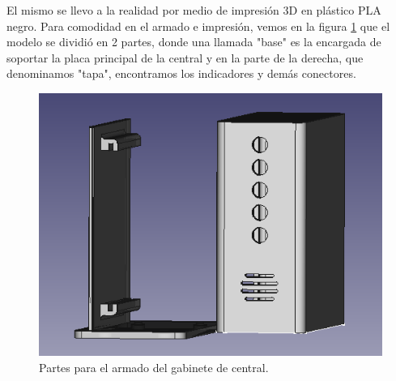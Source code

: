 \par El mismo se llevo a la realidad por medio de impresión 3D en plástico PLA negro. Para comodidad en el armado e impresión, vemos en la figura \ref{im:impresion-central} que el modelo se dividió en 2 partes, donde una llamada "base" es la encargada de soportar la placa principal de la central y en la parte de la derecha, que denominamos "tapa", encontramos los indicadores y demás conectores. 

\begin{figure}[h!]
	\centering
	\includegraphics[scale=.53]{images/central/modelo-3d-central-separado.png}
    \caption{Partes para el armado del gabinete de central.}
	\label{im:impresion-central}
\end{figure}
